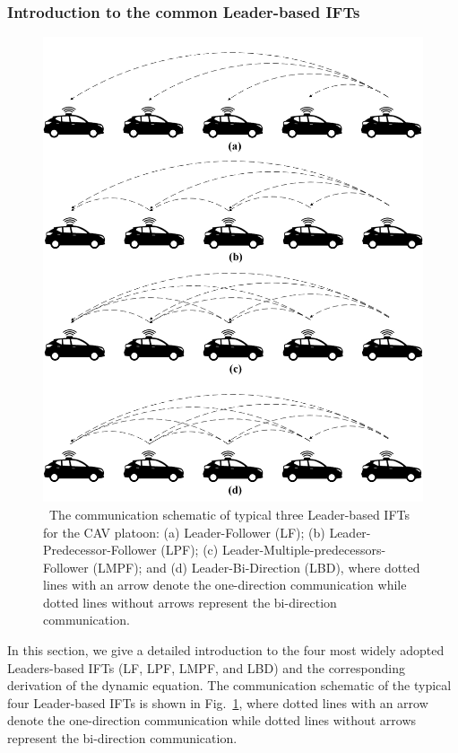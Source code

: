 \documentclass[a4paper]{cas-sc}
\begin{document}
\subsubsection{Introduction to the common Leader-based IFTs}
\label{Section 5.1.2}

\begin{figure}
  \centering
  \includegraphics[width=12cm]{figs/fig2.png}
  \caption{~The communication schematic of typical three Leader-based IFTs for the CAV platoon: (a) Leader-Follower (LF); (b) Leader-Predecessor-Follower (LPF); (c) Leader-Multiple-predecessors-Follower (LMPF); and (d) Leader-Bi-Direction (LBD), where dotted lines with an arrow denote the one-direction communication while dotted lines without arrows represent the bi-direction communication.}
  \label{fig2}
\end{figure}

In this section, we give a detailed introduction to the four most widely adopted Leaders-based IFTs (LF, LPF, LMPF, and LBD) and the corresponding derivation of the dynamic equation. The communication schematic of the typical four Leader-based IFTs is shown in Fig.~\ref{fig2}, where dotted lines with an arrow denote the one-direction communication while dotted lines without arrows represent the bi-direction communication.
\end{document}

